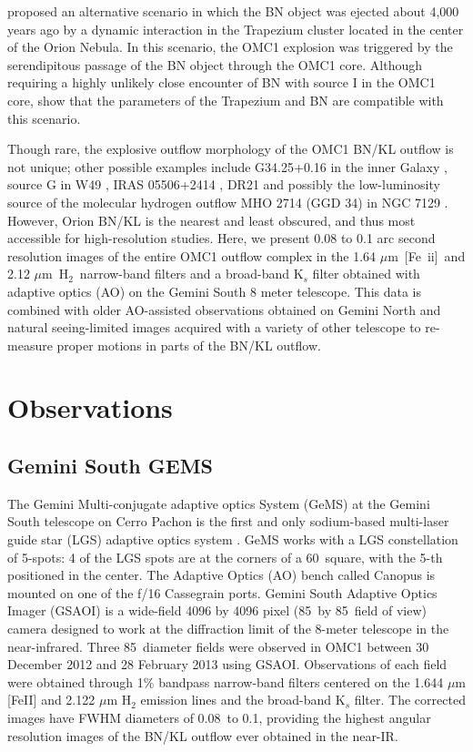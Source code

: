 \documentclass{aa}
\newcommand{\Feii}{[Fe~{\sc ii}]}
\newcommand{\um}{$\mu$m}
\newcommand{\hh}{\ensuremath{\textrm{H}_{2}}}			%
\begin{document}
\citet{Tan2004} proposed an alternative scenario in which the BN object was ejected 
about 4,000 years ago by a dynamic interaction in the Trapezium cluster located 
in the center of the Orion Nebula.   In this scenario,  the OMC1 explosion was
triggered by the  serendipitous passage of the BN object through the OMC1 core.   
Although  requiring a highly unlikely close encounter of  BN with source I in the 
OMC1 core,  \citet{Tan2012} show that the parameters of the Trapezium and 
BN are compatible with  this scenario.
 
Though rare, the explosive outflow morphology of the  OMC1 BN/KL 
outflow is not unique; other possible  examples include G34.25+0.16 in the inner
Galaxy \citep{Cyganowski2008},  source G in W49 \citep{Smith2009}, 
IRAS 05506+2414  \citep{Sahai2008}, DR21 \citep{Zapata2013}
and possibly the  low-luminosity source
of the molecular hydrogen outflow MHO 2714 (GGD 34) in NGC 7129
\citep{Eisloffel2000}.   However,  Orion BN/KL 
is the nearest and least  obscured,  and thus most accessible for high-resolution 
studies.   Here, we present 0.08 to 0.1 arc second resolution images of the 
entire OMC1 outflow complex in the 1.64 \um\ \Feii\  and 2.12 \um\ \hh\  narrow-band filters 
and a broad-band K$_s$ filter obtained with adaptive optics (AO) on the Gemini South  8 
meter telescope.    This data is combined with  older AO-assisted observations
obtained on Gemini North and natural seeing-limited images acquired with a variety
of other telescope to re-measure proper motions in parts of the BN/KL outflow. 


\section{Observations}

\subsection{Gemini South GEMS}

The Gemini Multi-conjugate adaptive optics System (GeMS) at the Gemini South telescope
on Cerro Pachon is the first and only sodium-based multi-laser guide star (LGS) adaptive
optics system \citep{Rigaut2014,Rigaut2012,Neichel2014,Neichel2013,dOrgeville2012}.
GeMS works with a LGS constellation of 5-spots:  4 of the LGS spots are at the corners of a
60\arcsec\ square, with the 5-th positioned in the center.  The Adaptive Optics (AO)  bench
called Canopus is mounted on one of the f/16 Cassegrain ports.    Gemini South 
Adaptive Optics Imager (GSAOI) is a wide-field 4096 by 4096 pixel 
(85\arcsec\ by 85\arcsec\ field of view) 
camera designed to work at the diffraction limit of the 8-meter telescope in the near-infrared.
Three 85\arcsec\  diameter fields were observed in OMC1 between 30 December 2012 and
28 February 2013 using GSAOI.  Observations of each field were obtained through 1\%
bandpass narrow-band filters centered on the 1.644 $\mu$m [FeII] and 2.122 $\mu$m
H$_2$ emission lines and the broad-band K$_s$ filter.  
The corrected images have FWHM diameters of 0.08\arcsec\ to  0.1\arcsec , providing the 
highest angular resolution images of the BN/KL outflow ever obtained in the near-IR. 
\end{document}
